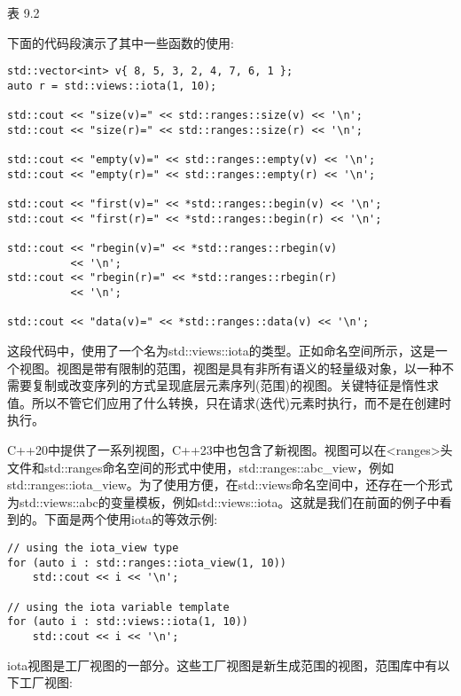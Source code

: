 \begin{center}
表 9.2
\end{center}

下面的代码段演示了其中一些函数的使用:

\begin{lstlisting}[style=styleCXX]
std::vector<int> v{ 8, 5, 3, 2, 4, 7, 6, 1 };
auto r = std::views::iota(1, 10);

std::cout << "size(v)=" << std::ranges::size(v) << '\n';
std::cout << "size(r)=" << std::ranges::size(r) << '\n';

std::cout << "empty(v)=" << std::ranges::empty(v) << '\n';
std::cout << "empty(r)=" << std::ranges::empty(r) << '\n';

std::cout << "first(v)=" << *std::ranges::begin(v) << '\n';
std::cout << "first(r)=" << *std::ranges::begin(r) << '\n';

std::cout << "rbegin(v)=" << *std::ranges::rbegin(v)
		  << '\n';
std::cout << "rbegin(r)=" << *std::ranges::rbegin(r)
		  << '\n';
		  
std::cout << "data(v)=" << *std::ranges::data(v) << '\n';
\end{lstlisting}

这段代码中，使用了一个名为std::views::iota的类型。正如命名空间所示，这是一个视图。视图是带有限制的范围，视图是具有非所有语义的轻量级对象，以一种不需要复制或改变序列的方式呈现底层元素序列(范围)的视图。关键特征是惰性求值。所以不管它们应用了什么转换，只在请求(迭代)元素时执行，而不是在创建时执行。

C++20中提供了一系列视图，C++23中也包含了新视图。视图可以在<ranges>头文件和std::ranges命名空间的形式中使用，std::ranges::abc\_view，例如std::ranges::iota\_view。为了使用方便，在std::views命名空间中，还存在一个形式为std::views::abc的变量模板，例如std::views::iota。这就是我们在前面的例子中看到的。下面是两个使用iota的等效示例:

\begin{lstlisting}[style=styleCXX]
// using the iota_view type
for (auto i : std::ranges::iota_view(1, 10))
	std::cout << i << '\n';

// using the iota variable template
for (auto i : std::views::iota(1, 10))
	std::cout << i << '\n';
\end{lstlisting}

iota视图是工厂视图的一部分。这些工厂视图是新生成范围的视图，范围库中有以下工厂视图:

